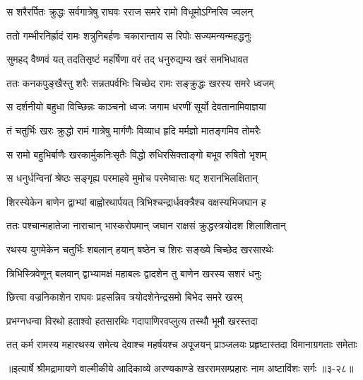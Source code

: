 \twolineshloka
{स शरैरर्पितः क्रुद्धः सर्वगात्रेषु राघवः}
{रराज समरे रामो विधूमोऽग्निरिव ज्वलन्} %

\twolineshloka
{ततो गम्भीरनिर्ह्रादं रामः शत्रुनिबर्हणः}
{चकारान्ताय स रिपोः सज्यमन्यन्महद्धनुः} %

\twolineshloka
{सुमहद् वैष्णवं यत् तदतिसृष्टं महर्षिणा}
{वरं तद् धनुरुद्यम्य खरं समभिधावत} %

\twolineshloka
{ततः कनकपुङ्खैस्तु शरैः सन्नतपर्वभिः}
{चिच्छेद रामः सङ्क्रुद्धः खरस्य समरे ध्वजम्} %

\twolineshloka
{स दर्शनीयो बहुधा विच्छिन्नः काञ्चनो ध्वजः}
{जगाम धरणीं सूर्यो देवतानामिवाज्ञया} %

\twolineshloka
{तं चतुर्भिः खरः क्रुद्धो रामं गात्रेषु मार्गणैः}
{विव्याध हृदि मर्मज्ञो मातङ्गमिव तोमरैः} %

\twolineshloka
{स रामो बहुभिर्बाणैः खरकार्मुकनिःसृतैः}
{विद्धो रुधिरसिक्ताङ्गो बभूव रुषितो भृशम्} %

\twolineshloka
{स धनुर्धन्विनां श्रेष्ठः सङ्गृह्य परमाहवे}
{मुमोच परमेष्वासः षट् शरानभिलक्षितान्} %

\twolineshloka
{शिरस्येकेन बाणेन द्वाभ्यां बाह्वोरथार्पयत्}
{त्रिभिश्चन्द्रार्धवक्त्रैश्च वक्षस्यभिजघान ह} %

\twolineshloka
{ततः पश्चान्महातेजा नाराचान् भास्करोपमान्}
{जघान राक्षसं क्रुद्धस्त्रयोदश शिलाशितान्} %

\twolineshloka
{रथस्य युगमेकेन चतुर्भिः शबलान् हयान्}
{षष्ठेन च शिरः सङ्ख्ये चिच्छेद खरसारथेः} %

\twolineshloka
{त्रिभिस्त्रिवेणून् बलवान् द्वाभ्यामक्षं महाबलः}
{द्वादशेन तु बाणेन खरस्य सशरं धनुः} %

\twolineshloka
{छित्त्वा वज्रनिकाशेन राघवः प्रहसन्निव}
{त्रयोदशेनेन्द्रसमो बिभेद समरे खरम्} %

\twolineshloka
{प्रभग्नधन्वा विरथो हताश्वो हतसारथिः}
{गदापाणिरवप्लुत्य तस्थौ भूमौ खरस्तदा} %

\twolineshloka
{तत् कर्म रामस्य महारथस्य समेत्य देवाश्च महर्षयश्च}
{अपूजयन् प्राञ्जलयः प्रहृष्टास्तदा विमानाग्रगताः समेताः} %


॥इत्यार्षे श्रीमद्रामायणे वाल्मीकीये आदिकाव्ये अरण्यकाण्डे खररामसम्प्रहारः नाम अष्टाविंशः सर्गः ॥३-२८॥

